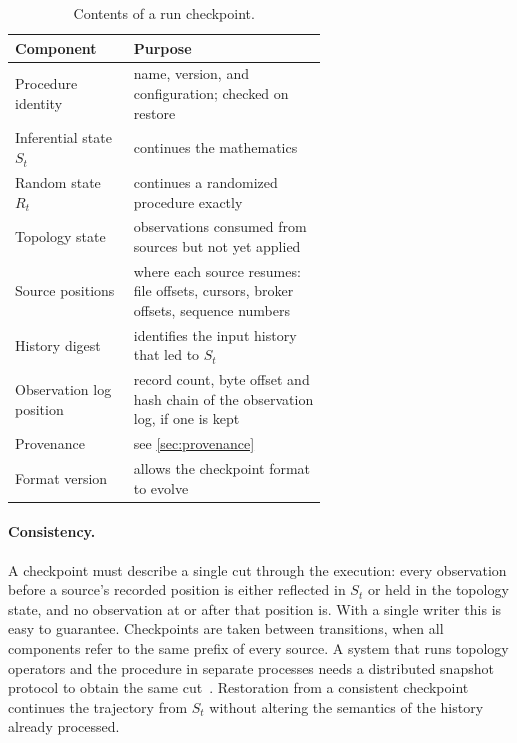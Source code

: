 \documentclass[11pt,a4paper]{article}
\theoremstyle{definition}
\theoremstyle{remark}
\begin{document}
\begin{table}[t]
\centering
\caption{Contents of a run checkpoint.}
\label{tab:checkpoint}
\begin{tabular}{lp{0.62\linewidth}}
\toprule
\textbf{Component} & \textbf{Purpose} \\
\midrule
Procedure identity & name, version, and configuration; checked on restore \\
Inferential state $S_t$ & continues the mathematics \\
Random state $R_t$ & continues a randomized procedure exactly \\
Topology state & observations consumed from sources but not yet applied \\
Source positions & where each source resumes: file offsets, cursors,
broker offsets, sequence numbers \\
History digest & identifies the input history that led to $S_t$ \\
Observation log position & record count, byte offset and hash chain of
the observation log, if one is kept \\
Provenance & see \cref{sec:provenance} \\
Format version & allows the checkpoint format to evolve \\
\bottomrule
\end{tabular}
\end{table}

\paragraph{Consistency.}
A checkpoint must describe a single cut through the execution: every
observation before a source's recorded position is either reflected in
$S_t$ or held in the topology state, and no observation at or after that
position is. With a single writer this is easy to guarantee. Checkpoints
are taken between transitions, when all components refer to the same
prefix of every source. A system that runs topology operators and the
procedure in separate processes needs a distributed snapshot protocol to
obtain the same cut~\cite{chandy1985,elnozahy2002}. Restoration from a
consistent checkpoint continues the trajectory from $S_t$ without
altering the semantics of the history already processed.
\end{document}
